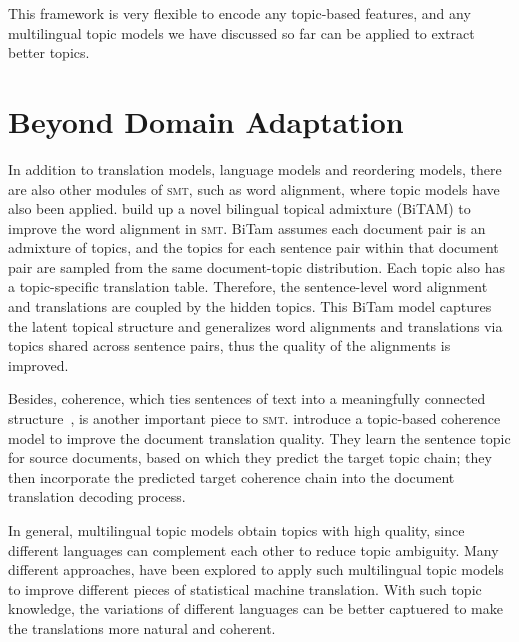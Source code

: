 This framework is very flexible to encode any topic-based features,
and any multilingual topic models we have discussed so far can be
applied to extract better topics.


\section{Beyond Domain Adaptation}

In addition to translation models, language models and reordering models,
there are also other modules of \textsc{smt}, such as word alignment,
where topic models have also been applied. \citet{zhao-06} build up a
novel bilingual topical admixture (BiTAM) to improve the word
alignment in \textsc{smt}. BiTam assumes each document pair is an
admixture of topics, and the topics for each sentence pair within that
document pair are sampled from the same document-topic
distribution. Each topic also has a topic-specific translation
table. Therefore, the sentence-level word alignment and translations
are coupled by the hidden topics. This BiTam model captures the latent
topical structure and generalizes word alignments and translations via
topics shared across sentence pairs, thus the quality of the
alignments is improved.

Besides, coherence, which ties sentences of text into a meaningfully
connected structure~\citep{xiong-13}, is another important piece to
\textsc{smt}.\citet{xiong-13} introduce a topic-based coherence model
to improve the document translation quality. They learn the sentence
topic for source documents, based on which they predict the target
topic chain; they then incorporate the predicted target coherence
chain into the document translation decoding process.


In general, multilingual topic models obtain topics with high quality,
since different languages can complement each other to reduce topic
ambiguity. Many different approaches, have been explored to apply such
multilingual topic models to improve different pieces of statistical
machine translation. With such topic knowledge, the variations of
different languages can be better captuered to make the translations
more natural and coherent.

